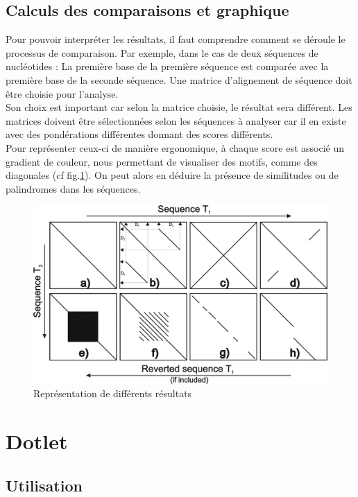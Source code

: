 \documentclass{report}
\begin{document}
\section{Calculs des comparaisons et graphique}

Pour pouvoir interpréter les résultats, il faut comprendre comment se déroule le processus de comparaison. Par exemple, dans le cas de deux séquences de nucléotides : La première base de la première séquence est comparée avec la première base de la seconde séquence. Une matrice d'alignement de séquence doit être choisie pour l'analyse.\\
Son choix est important car selon la matrice choisie, le résultat sera différent. Les matrices doivent être sélectionnées selon les séquences à analyser car il en existe avec des pondérations différentes donnant des scores différents.\\
Pour représenter ceux-ci de manière ergonomique, à chaque score est associé un gradient de couleur, nous permettant de visualiser des motifs, comme des diagonales (cf fig.\ref{schema}). On peut alors en déduire la présence de similitudes ou de palindromes dans les séquences.\\


\begin{figure}[!h]
\centerline{\includegraphics[scale=0.35]{SchemaDotplot.png}}
\caption{Représentation de différents résultats}
\label{schema}
\end{figure}

\chapter{Dotlet}
\section{Utilisation}
\end{document}
